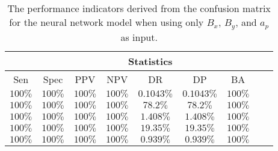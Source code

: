\begin{table}[!ht]
	\centering
	\begin{tabular}{|c|c|c|c|c|c|c|c|c|}
		\hline
		 & \multicolumn{7}{c|}{Statistics} \\ \hline
		Sen & Spec & PPV & NPV & DR & DP & BA \\ \hline
		$100\%$ & $100\%$ & $100\%$ & $100\%$ & $0.1043\%$ & $0.1043\%$ & $100\%$ \\ \hline
		$100\%$ & $100\%$ & $100\%$ & $100\%$ & $78.2\%$ & $78.2\%$ & $100\%$ \\ \hline
		$100\%$ & $100\%$ & $100\%$ & $100\%$ & $1.408\%$ & $1.408\%$ & $100\%$ \\ \hline
		$100\%$ & $100\%$ & $100\%$ & $100\%$ & $19.35\%$ & $19.35\%$ & $100\%$ \\ \hline
		$100\%$ & $100\%$ & $100\%$ & $100\%$ & $0.939\%$ & $0.939\%$ & $100\%$ \\ \hline
	\end{tabular}
	\caption{The performance indicators derived from the confusion matrix for the neural network model when using only $B_{x}$, $B_{y}$, and $a_{p}$ as input.}
	\label{tab:cs:xyap:nnet}
\end{table}
